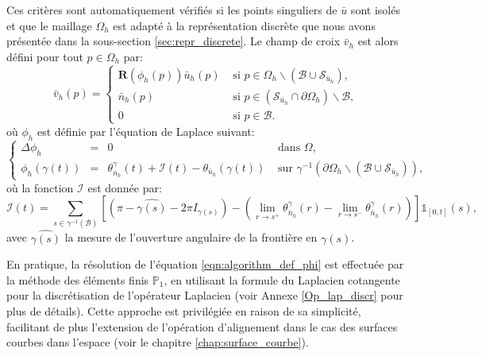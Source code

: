 Ces critères sont automatiquement vérifiés si les points singuliers de $\bar{u}$ sont isolés et que le maillage $\Omega_h$ est adapté à la représentation discrète que nous avons présentée dans la sous-section \ref{sec:repr_discrete}. Le champ de croix $\bar{v}_h$ est alors défini pour tout $p\in\Omega_h$ par:
\begin{equation}
\bar{v}_h(p)=
\left\{
\begin{array}{ll}
\mathbf{R}(\phi_h(p))\bar{u}_h(p) & \mbox{ si } p\in\Omega_h\backslash(\mathcal{B}\cup\mathcal{S}_{\bar{u}_h}),\\[0.5cm]
\bar{n}_h(p) & \mbox{ si } p\in(\mathcal{S}_{\bar{u}_h}\cap\partial\Omega_h)\backslash\mathcal{B},\\[0.5cm]
0 & \mbox{ si } p\in\mathcal{B}.
\end{array}
\right.
\label{eqn:etude_def_v_second}
\end{equation}
où $\phi_h$ est définie par l'équation de Laplace suivant:
\begin{equation}
\left\{
\begin{array}{lcll}
\Delta\phi_h &=& 0 &\mbox{ dans }\Omega,\\[0.5cm]
\phi_h(\gamma(t))&=&\theta_{\bar{n}_h}^\gamma(t)+\mathcal{I}(t)-\theta_{\bar{u}_h}(\gamma(t))& \mbox{ sur } \gamma^{-1}(\partial\Omega_h\backslash(\mathcal{B}\cup\mathcal{S}_{\bar{u}_h})),
\end{array}
\right.
\label{eqn:algorithm_def_phi}
\end{equation}
où la fonction $\mathcal{I}$ est donnée par:
$$
\mathcal{I}(t)=\displaystyle\sum_{s\in\gamma^{-1}(\mathcal{B})}\left[\left(\pi-\widehat{\gamma(s)}-2\pi I_{\gamma(s)}\right)-\left(\displaystyle\lim\limits_{r\rightarrow s^+}\theta^{\gamma}_{\bar{n}_h}(r) - \lim\limits_{r\rightarrow s^-}\theta^{\gamma}_{\bar{n}_h}(r)\right)\right]\mathbb{1}_{[0, t]}(s),
$$
avec $\widehat{\gamma(s)}$ la mesure de l'ouverture angulaire de la frontière en $\gamma(s)$.

En pratique, la résolution de l'équation \eqref{eqn:algorithm_def_phi} est effectuée par la méthode des éléments finis $\mathbb{P}_1$, en utilisant la formule du Laplacien cotangente pour la discrétisation de l'opérateur Laplacien \cite{solomon2014laplace, nealen2006laplacian, belkin2008discrete} (voir Annexe \ref{Op_lap_discr} pour plus de détails). Cette approche est privilégiée en raison de sa simplicité, facilitant de plus l'extension de l'opération d'alignement dans le cas des surfaces courbes dans l'espace (voir le chapitre \ref{chap:surface_courbe}).

